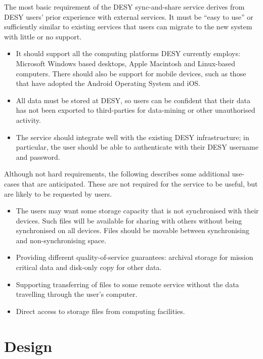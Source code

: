 \documentclass[a4paper]{jpconf}
\begin{document}
The most basic requirement of the DESY sync-and-share service derives
from DESY users' prior experience with external services.  It must be
``easy to use'' or sufficiently similar to existing services that
users can migrate to the new system with little or no support.

\begin{itemize}
\item
It should support all the computing platforms DESY currently employs:
Microsoft Windows based desktops, Apple Macintosh and Linux-based
computers.  There should also be support for mobile devices, such as
those that have adopted the Android Operating System and iOS.

\item
All data must be stored at DESY, so users can be confident that their
data has not been exported to third-parties for data-mining or other
unauthorised activity.

\item
The service should integrate well with the existing DESY
infrastructure; in particular, the user should be able to authenticate
with their DESY username and password.
\end{itemize}

Although not hard requirements, the following describes some
additional use-cases that are anticipated.  These are not required for
the service to be useful, but are likely to be requested by users.

\begin{itemize}
\item
The users may want some storage capacity that is not synchronised with
their devices.  Such files will be available for sharing with others
without being synchronised on all devices.  Files should be movable
between synchronising and non-synchronising space.

\item
Providing different quality-of-service guarantees: archival storage
for mission critical data and disk-only copy for other data.

\item
Supporting transferring of files to some remote service without the
data travelling through the user's computer.

\item
 Direct access to storage files from computing facilities.
\end{itemize}

\section{Design}
\end{document}
